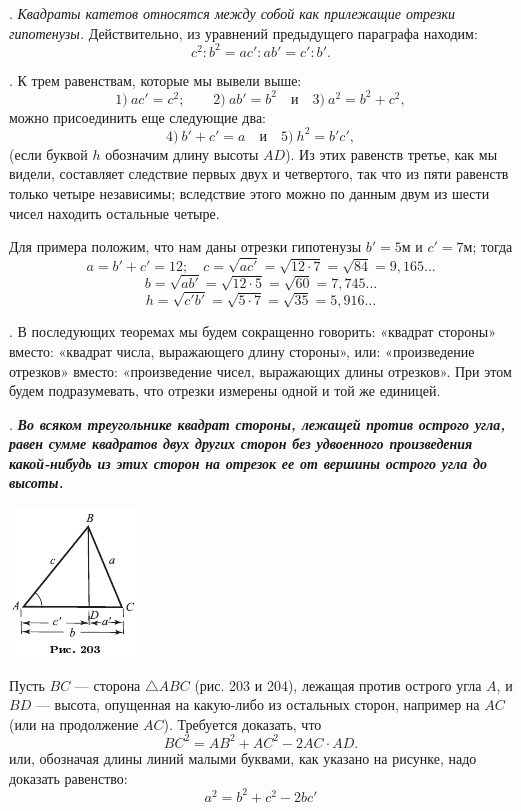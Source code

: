 \documentclass[oneside]{book}
\begin{document}
.
\emph{Квадраты катетов относятся между собой как прилежащие отрезки гипотенузы.}
Действительно, из уравнений предыдущего параграфа находим:
\[c^2:b^2=ac':ab'=c':b'.\]

.
К трем равенствам, которые мы вывели выше:
\[1)\ ac'=c^2;
\qquad
2)\ ab'=b^2
\quad
\text{и}
\quad
3)\ a^2=b^2+c^2,
\]
можно присоединить еще следующие два:
\[4)\ b'+c'=a
\quad
\text{и}
\quad
5)\ h^2=b'c',
\]
(если буквой $h$ обозначим длину высоты $AD$).
Из этих равенств третье, как мы видели, составляет следствие первых двух и четвертого, так что из пяти равенств только четыре независимы;
вследствие этого можно по данным двум из шести чисел находить остальные четыре.

Для примера положим, что нам даны отрезки гипотенузы $b' = 5 \text{м}$ и $c' = 7\text{м}$;
тогда
\[a=b'+c'=12;
\quad
c=
\sqrt{ac'}=
\sqrt{12\cdot 7}=
\sqrt{84}=9{,}165\dots
\]
\[b=\sqrt{ab'}=\sqrt{12\cdot 5}=\sqrt{60}=7{,}745\dots\]
\[h=\sqrt{c'b'}=\sqrt{5\cdot 7}=\sqrt{35} = 5{,}916\dots\]


.
В последующих теоремах мы будем сокращенно говорить:
«квадрат стороны» вместо: «квадрат числа, выражающего длину стороны», 
или: «произведение отрезков» вместо:
«произведение чисел, выражающих длины отрезков».
При этом будем подразумевать, что отрезки измерены одной и той же единицей.

.
\textbf{\emph{Во всяком треугольнике квадрат стороны, лежащей против острого угла, равен сумме квадратов двух других сторон без удвоенного произведения какой-нибудь из этих сторон на отрезок ее от вершины острого угла до высоты.}}

\includegraphics{pics/ris-203}

Пусть $BC$ — сторона $\triangle ABC$ (рис. 203 и 204), лежащая против острого угла $A$, и $BD$ — высота, опущенная на какую-либо из остальных сторон, %
например на $AC$ (или на продолжение $AC$).
Требуется доказать, что
\[BC^2=AB^2+AC^2-2AC\cdot  AD.\]
или, обозначая длины линий малыми буквами, как указано на рисунке, надо доказать равенство:
\[a^2=b^2+c^2-2bc'\]
\end{document}

